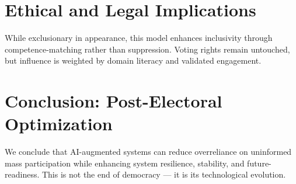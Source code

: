 \documentclass[11pt]{article}
\begin{document}
\section{Ethical and Legal Implications}
While exclusionary in appearance, this model enhances inclusivity through competence-matching rather than suppression. Voting rights remain untouched, but influence is weighted by domain literacy and validated engagement.

\section{Conclusion: Post-Electoral Optimization}
We conclude that AI-augmented systems can reduce overreliance on uninformed mass participation while enhancing system resilience, stability, and future-readiness. This is not the end of democracy — it is its technological evolution.
\end{document}

